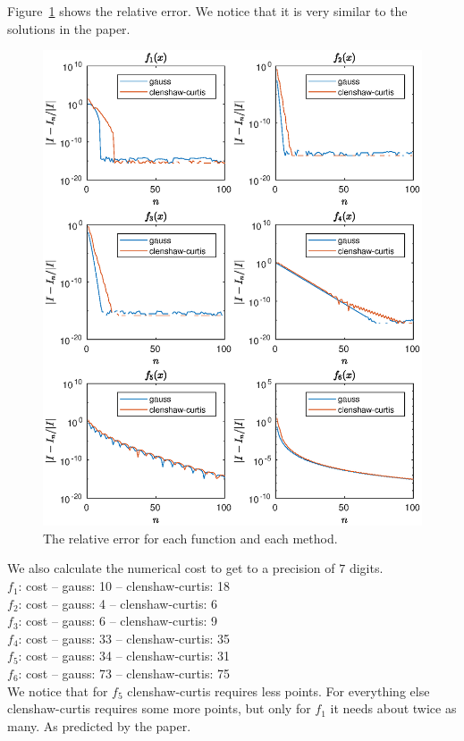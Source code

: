 \documentclass{article}
\begin{document}
Figure~\ref{fig:re} shows the relative error. We notice that it is very similar to the solutions in the paper.

\begin{figure}[H]
\includegraphics[width=0.9\linewidth]{re.eps}
\centering
\caption{The relative error for each function and each method.} \label{fig:re}
\end{figure}

\pagebreak

We also calculate the numerical cost to get to a precision of $7$ digits. \\
$f_1$: cost -- gauss: 10 -- clenshaw-curtis: 18 \\
$f_2$: cost -- gauss: 4  -- clenshaw-curtis: 6  \\
$f_3$: cost -- gauss: 6  -- clenshaw-curtis: 9  \\
$f_4$: cost -- gauss: 33 -- clenshaw-curtis: 35 \\
$f_5$: cost -- gauss: 34 -- clenshaw-curtis: 31 \\
$f_6$: cost -- gauss: 73 -- clenshaw-curtis: 75 \\
We notice that for $f_5$ clenshaw-curtis requires less points. For everything else clenshaw-curtis requires some more points, but only for $f_1$ it needs about twice as many. As predicted by the paper.
\end{document}
